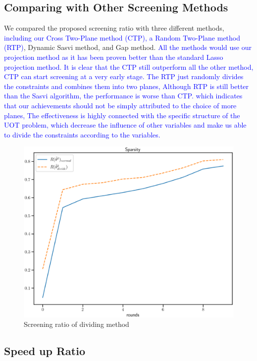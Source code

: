 \documentclass[twoside]{article}
\theoremstyle{plain}
\newcommand{\changeXS}[1]{\textcolor{blue}{#1}}
\begin{document}
\subsection{Comparing with Other Screening Methods}
We compared the proposed screening ratio with three different methods, \changeXS{including our Cross Two-Plane method (CTP), a Random Two-Plane method (RTP)}, Dynamic Sasvi method, and Gap method. \changeXS{All the methods would use our projection method as it has been proven better than the standard Lasso projection method. It is clear that the CTP still outperform all the other method, CTP can start screening at a very early stage. The RTP just randomly divides the constraints and combines them into two planes, Although RTP is still better than the Sasvi algorithm, the performance is worse than CTP. which indicates that our achievements should not be simply attributed to the choice of more planes, The effectiveness is highly connected with the specific structure of the UOT problem, which decrease the influence of other variables and make us able to divide the constraints according to the variables.}
\begin{figure}[h]
\begin{center}
\includegraphics[width = \linewidth]{pic/screening_divide_ratio_long}
\caption{Screening ratio of dividing method}
\end{center}
\end{figure}


\subsection{Speed up Ratio}
\end{document}
